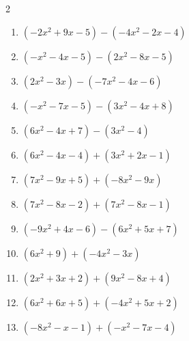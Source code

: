 \begin{multicols}{2}
\begin{enumerate}

  \item $(-2x^{2}+9x-5)-(-4x^{2}-2x-4)$


  \item $(-x^{2}-4x-5)-(2x^{2}-8x-5)$


  \item $(2x^{2}-3x)-(-7x^{2}-4x-6)$


  \item $(-x^{2}-7x-5)-(3x^{2}-4x+8)$


  \item $(6x^{2}-4x+7)-(3x^{2}-4)$


  \item $(6x^{2}-4x-4)+(3x^{2}+2x-1)$


\columnbreak %

  \item $(7x^{2}-9x+5)+(-8x^{2}-9x)$


  \item $(7x^{2}-8x-2)+(7x^{2}-8x-1)$


  \item $(-9x^{2}+4x-6)-(6x^{2}+5x+7)$


  \item $(6x^{2}+9)+(-4x^{2}-3x)$


  \item $(2x^{2}+3x+2)+(9x^{2}-8x+4)$


  \item $(6x^{2}+6x+5)+(-4x^{2}+5x+2)$


  \item $(-8x^{2}-x-1)+(-x^{2}-7x-4)$



\end{enumerate}
\end{multicols}
